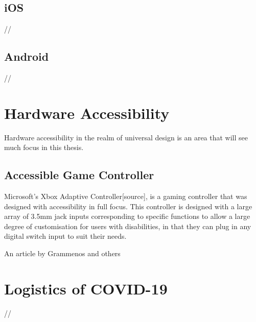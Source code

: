 
\subsection{iOS}
//


\subsection{Android}
//


\section{Hardware Accessibility}
Hardware accessibility in the realm of universal design is an area that will see much focus in this thesis. %


\subsection{Accessible Game Controller}
Microsoft's Xbox Adaptive Controller[source], is a gaming controller that was designed with accessibility in full focus.
This controller is designed with a large array of 3.5mm jack inputs corresponding to specific functions to allow a large degree of customisation for users with disabilities, in that they can plug in any digital switch input to suit their needs.

An article by Grammenos and others 


\section{Logistics of COVID-19}
//

